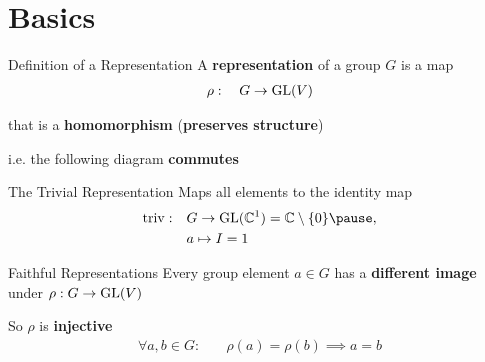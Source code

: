 
\section{Basics}

\begin{frame}{Definition of a Representation}
    \large
    A \textbf{representation} of a group $G$ is a map
    \Large
    \begin{align*}
        \rho: \quad G \to \operatorname{GL}(V)
    \end{align*}
    
    \normalsize
    \pause
    that is a \textbf{homomorphism} (\textbf{preserves structure})

    \pause
    i.e. the following diagram \textbf{commutes}
    \begin{figure}
        \centering
    \end{figure}
    {\hspace*{\fill} \cite{hein2013}}

\end{frame}

\begin{frame}{The Trivial Representation}
    \large
    Maps all elements to the identity map
    \Large
        \pause
    \begin{align*}
        \triv: \quad & G \to \GL(\C^1) = \C \setminus \{0\} \pause , \\
        & a \mapsto I = 1
    \end{align*}
    
    \normalsize
    {\hspace*{\fill} \cite{hein2013}}
\end{frame}

\begin{frame}{Faithful Representations}
    \large
    Every group element $a \in G$ has a \textbf{different image} under $\rho: G \to \operatorname{GL}(V)$

    \pause
    So $\rho$ is \textbf{injective}
    \Large
    \begin{align*}
        \forall a, b \in G: \quad & \rho(a) = \rho(b) \implies a = b
    \end{align*}
    \normalsize
    {\hspace*{\fill} \cite{hein2013}}
\end{frame}

